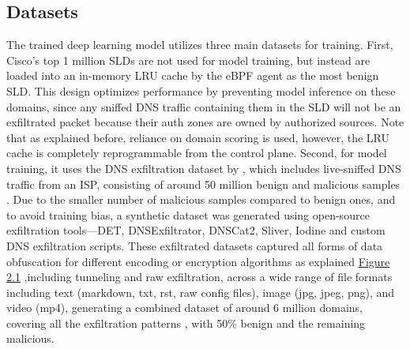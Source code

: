 \documentclass [11pt, proquest] {uwthesis}[2020/02/24]
\begin{document}
\subsection{Datasets}
\label{sec:dataset}
The trained deep learning model utilizes three main datasets for training. First, Cisco’s top 1 million SLDs are not used for model training, but instead are loaded into an in-memory LRU cache by the eBPF agent as the most benign SLD. This design optimizes performance by preventing model inference on these domains, since any sniffed DNS traffic containing them in the SLD will not be an exfiltrated packet because their auth zones are owned by authorized sources. Note that as explained before, reliance on domain scoring is used, however, the LRU cache is completely reprogrammable from the control plane. Second, for model training, it uses the DNS exfiltration dataset by \citeauthor{ziza2023dns}, which includes live-sniffed DNS traffic from an ISP, consisting of around 50 million benign and malicious samples \cite{ziza2023dns}. Due to the smaller number of malicious samples compared to benign ones, and to avoid training bias, a synthetic dataset was generated using open-source exfiltration tools—DET, DNSExfiltrator, DNSCat2, Sliver, Iodine and custom DNS exfiltration scripts. These exfiltrated datasets captured all forms of data obfuscation for different encoding or encryption algorithms as explained  \hyperref[dns_payload_obfuscation]{Figure 2.1} ,including tunneling and raw exfiltration, across a wide range of file formats including text (markdown, txt, rst, raw config files), image (jpg, jpeg, png), and video (mp4), generating a combined dataset of around 6 million domains, covering all the exfiltration patterns , with 50\% benign and the remaining malicious.


\begin{table}[ht]
\centering
{}
\caption{DNS Features in Kernel}
\label{sec:feature-kernel}
\end{table}
\end{document}
